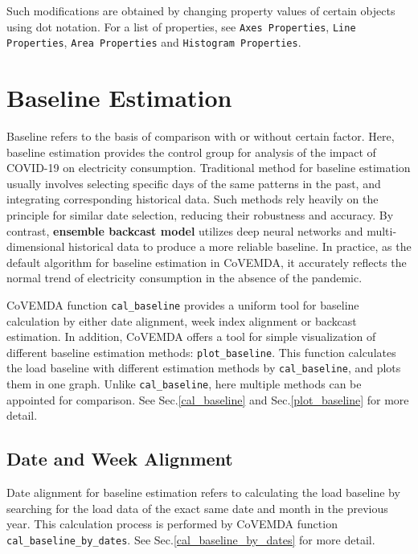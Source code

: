 \documentclass[10pt]{article}
\newcommand{\covemda}{CoVEMDA}
\numberwithin{equation}{section}
\numberwithin{table}{section}
\numberwithin{figure}{section}
\begin{document}
Such modifications are obtained by changing property values of certain objects using dot notation. For a list of properties, see \verb!Axes Properties!, \verb!Line Properties!, \verb!Area Properties! and \verb!Histogram Properties!.





\newpage
\section{Baseline Estimation} \label{sec:baseline}

Baseline refers to the basis of comparison with or without certain factor. Here, baseline estimation provides the control group for analysis of the impact of COVID-19 on electricity consumption. Traditional method for baseline estimation usually involves selecting specific days of the same patterns in the past, and integrating corresponding historical data. Such methods rely heavily on the principle for similar date selection, reducing their robustness and accuracy. By contrast, \textbf{ensemble backcast model} utilizes deep neural networks and multi-dimensional historical data to produce a more reliable baseline. In practice, as the default algorithm for baseline estimation in \covemda{}, it accurately reflects the normal trend of electricity consumption in the absence of the pandemic.

\covemda{} function \verb!cal_baseline! provides a uniform tool for baseline calculation by either date alignment, week index alignment or backcast estimation. In addition, \covemda{} offers a tool for simple visualization of different baseline estimation methods: \verb!plot_baseline!. This function calculates the load baseline with different estimation methods by \verb!cal_baseline!, and plots them in one graph. Unlike \verb!cal_baseline!, here multiple methods can be appointed for comparison. See Sec.\ref{cal_baseline} and Sec.\ref{plot_baseline} for more detail.



\subsection{Date and Week Alignment}

Date alignment for baseline estimation refers to calculating the load baseline by searching for the load data of the exact same date and month in the previous year. This calculation process is performed by \covemda{} function \verb!cal_baseline_by_dates!. See Sec.\ref{cal_baseline_by_dates} for more detail.
\end{document}
